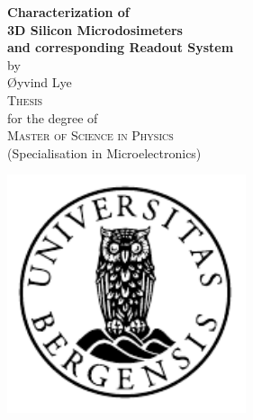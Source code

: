 \documentclass[12pt, a4paper]{report}
\begin{document}
\maketitle

\newcommand{\blankpage}{\newpage{}\thispagestyle{empty}\mbox{}\newpage{}}
\newcommand{\HRule}{\rule{\linewidth}{0.5mm}}


\blankpage %

\begin{titlepage}
\begin{center}
{ \Huge \bfseries Characterization of\\3D Silicon Microdosimeters\\and corresponding Readout System}\\[1cm]

\large by\\ \Large Øyvind Lye\\[1.6cm]

\textsc{\Large Thesis}\\
\large for the degree of\\
\textsc{\Large Master of Science in Physics}\\[0.5cm]
\large (Specialisation in Microelectronics) \\%


\end{center}
\vfill
\begin{center}
{
	\includegraphics[width=7cm]{uib-emblem-svart}\\[0.5cm]
	
}
\end{center}
\end{titlepage}
\end{document}
